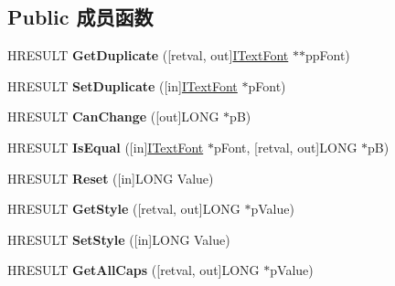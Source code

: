 \subsection*{Public 成员函数}
\begin{DoxyCompactItemize}
\item 
\mbox{\label{interface_i_text_font_aaaaf155e1bd29f1540dbbdd7d0dde6ad}} 
H\+R\+E\+S\+U\+LT {\bfseries Get\+Duplicate} (\mbox{[}retval, out\mbox{]}\hyperlink{interface_i_text_font}{I\+Text\+Font} $\ast$$\ast$pp\+Font)
\item 
\mbox{\label{interface_i_text_font_a0ab302716ae2714a57a3cc083ce6fabb}} 
H\+R\+E\+S\+U\+LT {\bfseries Set\+Duplicate} (\mbox{[}in\mbox{]}\hyperlink{interface_i_text_font}{I\+Text\+Font} $\ast$p\+Font)
\item 
\mbox{\label{interface_i_text_font_ad5e9f2b6b173c03a1502269bcecd9ffc}} 
H\+R\+E\+S\+U\+LT {\bfseries Can\+Change} (\mbox{[}out\mbox{]}L\+O\+NG $\ast$pB)
\item 
\mbox{\label{interface_i_text_font_a6ccc69bf3b75b2e43960ab7f26b9c3af}} 
H\+R\+E\+S\+U\+LT {\bfseries Is\+Equal} (\mbox{[}in\mbox{]}\hyperlink{interface_i_text_font}{I\+Text\+Font} $\ast$p\+Font, \mbox{[}retval, out\mbox{]}L\+O\+NG $\ast$pB)
\item 
\mbox{\label{interface_i_text_font_a9bb7fbca6441dbd197f2143f57cbb090}} 
H\+R\+E\+S\+U\+LT {\bfseries Reset} (\mbox{[}in\mbox{]}L\+O\+NG Value)
\item 
\mbox{\label{interface_i_text_font_adb5b062ee04e1c1dcbeefe7b6589ac10}} 
H\+R\+E\+S\+U\+LT {\bfseries Get\+Style} (\mbox{[}retval, out\mbox{]}L\+O\+NG $\ast$p\+Value)
\item 
\mbox{\label{interface_i_text_font_a32fd41cc36e27b0c1a0ad68f0be9a46a}} 
H\+R\+E\+S\+U\+LT {\bfseries Set\+Style} (\mbox{[}in\mbox{]}L\+O\+NG Value)
\item 
\mbox{\label{interface_i_text_font_aa5994b602fec15329ea94c9b84c9ccb0}} 
H\+R\+E\+S\+U\+LT {\bfseries Get\+All\+Caps} (\mbox{[}retval, out\mbox{]}L\+O\+NG $\ast$p\+Value)
$$
\end{DoxyCompactItemize}
